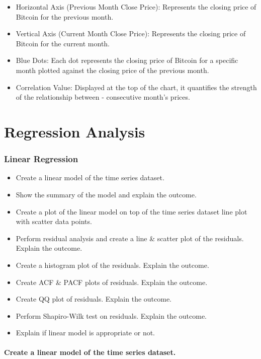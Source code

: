 \documentclass[
]{book}
\providecommand{\tightlist}{%
  \setlength{\itemsep}{0pt}\setlength{\parskip}{0pt}}
\begin{document}
\begin{itemize}
\tightlist
\item
  Horizontal Axis (Previous Month Close Price): Represents the closing price of Bitcoin for the previous month.
\item
  Vertical Axis (Current Month Close Price): Represents the closing price of Bitcoin for the current month.
\item
  Blue Dots: Each dot represents the closing price of Bitcoin for a specific month plotted against the closing price of the previous month.
\item
  Correlation Value: Displayed at the top of the chart, it quantifies the strength of the relationship between - consecutive month's prices.
\end{itemize}

\chapter{Regression Analysis}\label{regression-analysis}

\subsection{Linear Regression}\label{linear-regression}

\begin{itemize}
\tightlist
\item
  Create a linear model of the time series dataset.
\item
  Show the summary of the model and explain the outcome.
\item
  Create a plot of the linear model on top of the time series dataset line plot with scatter data points.
\item
  Perform residual analysis and create a line \& scatter plot of the residuals. Explain the outcome.
\item
  Create a histogram plot of the residuals. Explain the outcome.
\item
  Create ACF \& PACF plots of residuals. Explain the outcome.
\item
  Create QQ plot of residuals. Explain the outcome.
\item
  Perform Shapiro-Wilk test on residuals. Explain the outcome.
\item
  Explain if linear model is appropriate or not.
\end{itemize}

\subsubsection{Create a linear model of the time series dataset.}\label{create-a-linear-model-of-the-time-series-dataset.}
\end{document}
